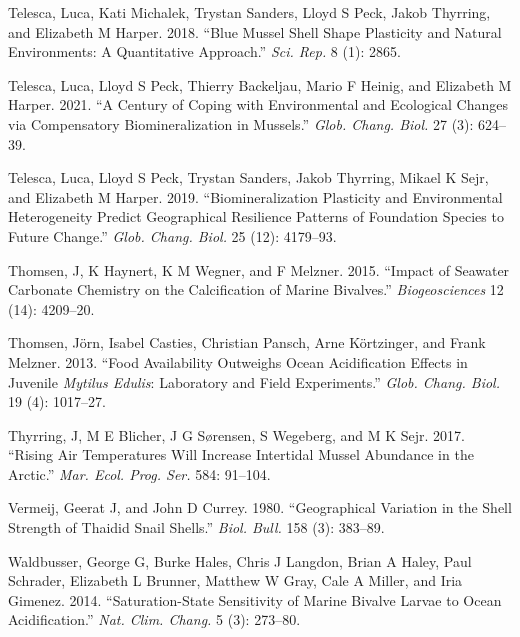 \documentclass[smallextended]{svjour3}       %
\newlength{\cslhangindent}
\newenvironment{CSLReferences}[2] %
 {%
  \setlength{\parindent}{0pt}
  \ifodd #1 \everypar{\setlength{\hangindent}{\cslhangindent}}\ignorespaces\fi
  \ifnum #2 > 0
  \setlength{\parskip}{#2\baselineskip}
  \fi
 }%
 {}
\begin{document}
\begin{CSLReferences}{1}{0}
\leavevmode{}%
Telesca, Luca, Kati Michalek, Trystan Sanders, Lloyd S Peck, Jakob
Thyrring, and Elizabeth M Harper. 2018. {``Blue Mussel Shell Shape
Plasticity and Natural Environments: A Quantitative Approach.''}
\emph{Sci. Rep.} 8 (1): 2865.

\leavevmode{}%
Telesca, Luca, Lloyd S Peck, Thierry Backeljau, Mario F Heinig, and
Elizabeth M Harper. 2021. {``A Century of Coping with Environmental and
Ecological Changes via Compensatory Biomineralization in Mussels.''}
\emph{Glob. Chang. Biol.} 27 (3): 624--39.

\leavevmode{}%
Telesca, Luca, Lloyd S Peck, Trystan Sanders, Jakob Thyrring, Mikael K
Sejr, and Elizabeth M Harper. 2019. {``Biomineralization Plasticity and
Environmental Heterogeneity Predict Geographical Resilience Patterns of
Foundation Species to Future Change.''} \emph{Glob. Chang. Biol.} 25
(12): 4179--93.

\leavevmode{}%
Thomsen, J, K Haynert, K M Wegner, and F Melzner. 2015. {``Impact of
Seawater Carbonate Chemistry on the Calcification of Marine Bivalves.''}
\emph{Biogeosciences} 12 (14): 4209--20.

\leavevmode{}%
Thomsen, Jörn, Isabel Casties, Christian Pansch, Arne Körtzinger, and
Frank Melzner. 2013. {``Food Availability Outweighs Ocean Acidification
Effects in Juvenile \emph{Mytilus Edulis}: Laboratory and Field
Experiments.''} \emph{Glob. Chang. Biol.} 19 (4): 1017--27.

\leavevmode{}%
Thyrring, J, M E Blicher, J G Sørensen, S Wegeberg, and M K Sejr. 2017.
{``Rising Air Temperatures Will Increase Intertidal Mussel Abundance in
the Arctic.''} \emph{Mar. Ecol. Prog. Ser.} 584: 91--104.

\leavevmode{}%
Vermeij, Geerat J, and John D Currey. 1980. {``Geographical Variation in
the Shell Strength of Thaidid Snail Shells.''} \emph{Biol. Bull.} 158
(3): 383--89.

\leavevmode{}%
Waldbusser, George G, Burke Hales, Chris J Langdon, Brian A Haley, Paul
Schrader, Elizabeth L Brunner, Matthew W Gray, Cale A Miller, and Iria
Gimenez. 2014. {``Saturation-State Sensitivity of Marine Bivalve Larvae
to Ocean Acidification.''} \emph{Nat. Clim. Chang.} 5 (3): 273--80.


\end{CSLReferences}
\end{document}
